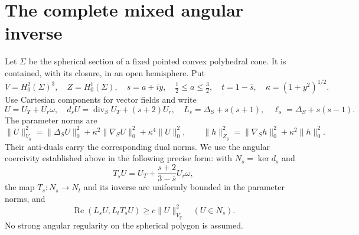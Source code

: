 \documentclass[11pt,a4paper]{article}
\theoremstyle{remark}
\numberwithin{equation}{section}
\begin{document}
\section{The complete mixed angular inverse}
\label{sec:g-angular}

Let $\Sigma$ be the spherical section of a fixed pointed convex polyhedral
cone. It is contained, with its closure, in an open hemisphere. Put
\[
 V=H^2_0(\Sigma)^3,\quad Z=H^1_0(\Sigma),\quad
 s=a+iy,\quad \tfrac12\le a\le\tfrac32,\quad t=1-\overline s,
 \quad\kappa=(1+y^2)^{1/2}.
\]
Use Cartesian components for vector fields and write
\[
 U=U_T+U_r\omega,\quad
 d_sU=\operatorname{div}_S U_T+(s+2)U_r,
 \quad L_s=\Delta_S+s(s+1),\quad \ell_s=\Delta_S+s(s-1).
\]
The parameter norms are
\[
 \|U\|_{V_y}^2=\|\Delta_SU\|_0^2+\kappa^2\|\nabla_SU\|_0^2
                  +\kappa^4\|U\|_0^2,
 \qquad
 \|h\|_{Z_y}^2=\|\nabla_Sh\|_0^2+\kappa^2\|h\|_0^2.
\]
Their anti-duals carry the corresponding dual norms. We use the angular
coercivity established above in the following precise form: with
$N_s=\ker d_s$ and
\[
 T_sU=U_T+\frac{s+2}{3-\overline s}U_r\omega,
\]
the map $T_s:N_s\to N_t$ and its inverse are uniformly bounded in the
parameter norms, and
\[
 \operatorname{Re}(L_sU,L_tT_sU)\ge c\|U\|_{V_y}^2
 \quad(U\in N_s).
\]
No strong angular regularity on the spherical polygon is assumed.
\end{document}

